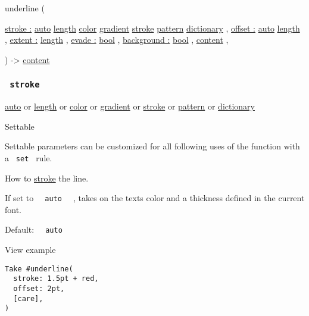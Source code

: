 { underline } (

{ \hyperref[parameters-stroke]{stroke :}
\href{/docs/reference/foundations/auto/}{auto}
\href{/docs/reference/layout/length/}{length}
\href{/docs/reference/visualize/color/}{color}
\href{/docs/reference/visualize/gradient/}{gradient}
\href{/docs/reference/visualize/stroke/}{stroke}
\href{/docs/reference/visualize/pattern/}{pattern}
\href{/docs/reference/foundations/dictionary/}{dictionary} , } {
\hyperref[parameters-offset]{offset :}
\href{/docs/reference/foundations/auto/}{auto}
\href{/docs/reference/layout/length/}{length} , } {
\hyperref[parameters-extent]{extent :}
\href{/docs/reference/layout/length/}{length} , } {
\hyperref[parameters-evade]{evade :}
\href{/docs/reference/foundations/bool/}{bool} , } {
\hyperref[parameters-background]{background :}
\href{/docs/reference/foundations/bool/}{bool} , } {
\href{/docs/reference/foundations/content/}{content} , }

) -\textgreater{} \href{/docs/reference/foundations/content/}{content}

\subsubsection{\texorpdfstring{\texttt{\ stroke\ }}{ stroke }}\label{parameters-stroke}

\href{/docs/reference/foundations/auto/}{auto} {or}
\href{/docs/reference/layout/length/}{length} {or}
\href{/docs/reference/visualize/color/}{color} {or}
\href{/docs/reference/visualize/gradient/}{gradient} {or}
\href{/docs/reference/visualize/stroke/}{stroke} {or}
\href{/docs/reference/visualize/pattern/}{pattern} {or}
\href{/docs/reference/foundations/dictionary/}{dictionary}

{{ Settable }}

\label{parameters-stroke-settable-tooltip}
Settable parameters can be customized for all following uses of the
function with a \texttt{\ set\ } rule.

How to \href{/docs/reference/visualize/stroke/}{stroke} the line.

If set to \texttt{\ }{\texttt{\ auto\ }}\texttt{\ } , takes on the
text\textquotesingle s color and a thickness defined in the current
font.

Default: \texttt{\ }{\texttt{\ auto\ }}\texttt{\ }


View example

\begin{verbatim}
Take #underline(
  stroke: 1.5pt + red,
  offset: 2pt,
  [care],
)
\end{verbatim}

